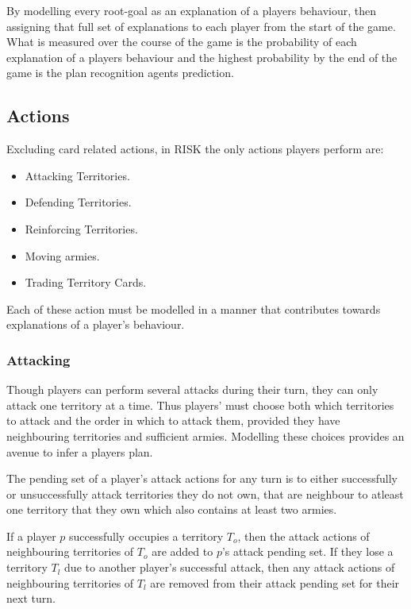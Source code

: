 \documentclass[parskip]{cs4rep}
\begin{document}
By modelling every root-goal as an explanation of a players behaviour, then assigning that full set of explanations to each player from the start of the game. What is measured over the course of the game is the probability of each explanation of a players behaviour and the highest probability by the end of the game is the plan recognition agents prediction.

\subsection{Actions}

Excluding card related actions, in RISK the only actions players perform are:

\begin{itemize}
\item
Attacking Territories.
\item
Defending Territories.
\item
Reinforcing Territories.
\item
Moving armies.
\item
Trading Territory Cards.
\end{itemize}

Each of these action must be modelled in a manner that contributes towards explanations of a player's behaviour.

\subsubsection{Attacking}

Though players can perform several attacks during their turn, they can only attack one territory at a time. Thus players' must choose both which territories to attack and the order in which to attack them, provided they have neighbouring territories and sufficient armies. Modelling these choices provides an avenue to infer a players plan.

The pending set of a player's attack actions for any turn is to either successfully or unsuccessfully attack territories they do not own, that are neighbour to atleast one territory that they own which also contains at least two armies.

If a player $p$ successfully occupies a territory $T_{o}$, then the attack actions of neighbouring territories of $T_{o}$ are added to $p$'s attack pending set. If they lose a territory $T_{l}$ due to another player's successful attack, then any attack actions of neighbouring territories of $T_{l}$ are removed from their attack pending set for their next turn. 
\end{document}
